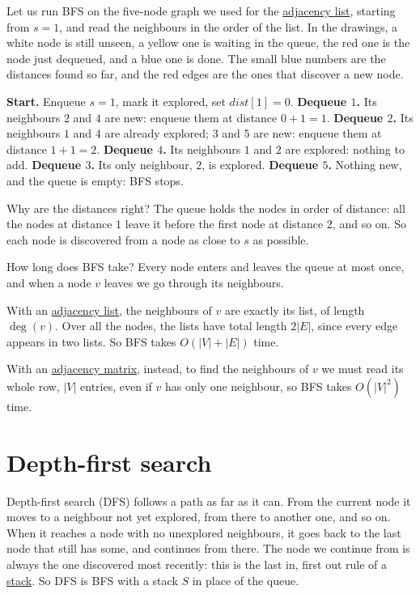 \documentclass[a4paper,12pt,oneside]{report}
\begin{document}
Let us run BFS on the five-node graph we used for the
\hyperref[def:adjacency-list]{adjacency list}, starting from $s=1$,
and read the neighbours in the order of the list. In the drawings, a
white node is still unseen, a yellow one is waiting in the queue, the
red one is the node just dequeued, and a blue one is done. The small
blue numbers are the distances found so far, and the red edges are the
ones that discover a new node.

\medskip
{}
  {\textbf{Start.} Enqueue $s=1$, mark it explored, set
   $\mathit{dist}[1]=0$.}
  {\textbf{Dequeue $1$.} Its neighbours $2$ and $4$ are new: enqueue
   them at distance $0+1=1$.}
  {\textbf{Dequeue $2$.} Its neighbours $1$ and $4$ are already
   explored; $3$ and $5$ are new: enqueue them at distance $1+1=2$.}
  {\textbf{Dequeue $4$.} Its neighbours $1$ and $2$ are explored:
   nothing to add.}
  {\textbf{Dequeue $3$.} Its only neighbour, $2$, is explored.}
  {\textbf{Dequeue $5$.} Nothing new, and the queue is empty: BFS
   stops.}

Why are the distances right? The queue holds the nodes in order of
distance: all the nodes at distance $1$ leave it before the first
node at distance $2$, and so on. So each node is discovered from a
node as close to $s$ as possible.

How long does BFS take? Every node enters and leaves the queue at most
once, and when a node $v$ leaves we go through its neighbours.

With an \hyperref[def:adjacency-list]{adjacency list}, the neighbours of $v$
are exactly its list, of length $\deg(v)$. Over all the nodes, the
lists have total length $2|E|$, since every edge appears in two lists.
So BFS takes $O(|V|+|E|)$ time.

With an \hyperref[def:adjacency-matrix]{adjacency matrix}, instead, to find
the neighbours of $v$ we must read its whole row, $|V|$ entries, even
if $v$ has only one neighbour, so BFS takes $O(|V|^2)$ time.

\section{Depth-first search}
\label{sec:dfs}

Depth-first search (DFS) follows a path as far as it can. From the
current node it moves to a neighbour not yet explored, from there to
another one, and so on. When it reaches a node with no unexplored
neighbours, it goes back to the last node that still has some, and
continues from there. The node we continue from is always the one
discovered most recently: this is the last in, first out rule of a
\hyperref[def:stack-adt]{stack}. So DFS is BFS with a stack $S$ in
place of the queue.
\end{document}
